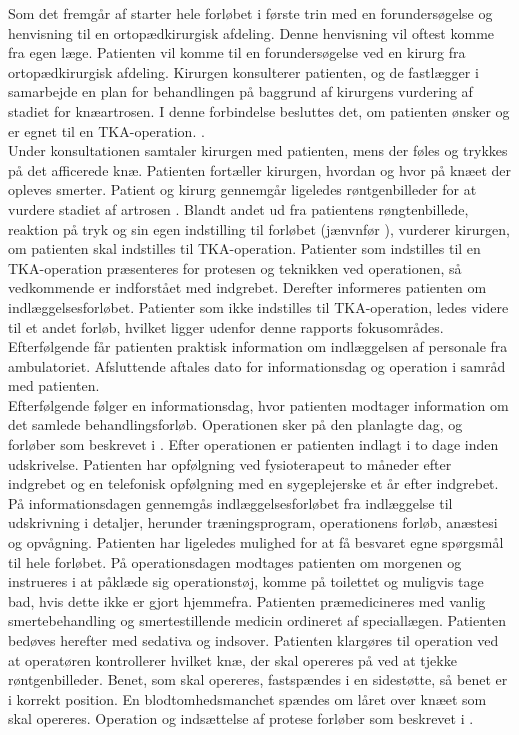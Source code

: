Som det fremgår af  starter hele forløbet i første trin med en forundersøgelse og henvisning til en ortopædkirurgisk afdeling. Denne henvisning vil oftest komme fra egen læge. Patienten vil komme til en forundersøgelse ved en kirurg fra ortopædkirurgisk afdeling. Kirurgen konsulterer patienten, og de fastlægger i samarbejde en plan for behandlingen på baggrund af kirurgens vurdering af stadiet for knæartrosen. I denne forbindelse besluttes det, om patienten ønsker og er egnet til en TKA-operation. \citep{pritka2015}. \\
Under konsultationen samtaler kirurgen med patienten, mens der føles og trykkes på det afficerede knæ. Patienten fortæller kirurgen, hvordan og hvor på knæet der opleves smerter. Patient og kirurg gennemgår ligeledes røntgenbilleder for at vurdere stadiet af artrosen \citep{pritka2015}.
Blandt andet ud fra patientens røngtenbillede, reaktion på tryk og sin egen indstilling til forløbet (jænvnfør ), vurderer kirurgen, om patienten skal indstilles til TKA-operation. Patienter som indstilles til en TKA-operation præsenteres for protesen og teknikken ved operationen, så vedkommende er indforstået med indgrebet. Derefter informeres patienten om indlæggelsesforløbet. Patienter som ikke indstilles til TKA-operation, ledes videre til et andet forløb, hvilket ligger udenfor denne rapports fokusområdes.
Efterfølgende får patienten praktisk information om indlæggelsen af personale fra ambulatoriet. Afsluttende aftales dato for informationsdag og operation i samråd med patienten. \citep{pritka2015} \\
Efterfølgende følger en informationsdag, hvor patienten modtager information om det samlede behandlingsforløb. Operationen sker på den planlagte dag, og forløber som beskrevet i . Efter operationen er patienten indlagt i to dage inden udskrivelse. Patienten har opfølgning ved fysioterapeut to måneder efter indgrebet og en telefonisk opfølgning med en sygeplejerske et år efter indgrebet. \citep{pritka2015} \\
På informationsdagen gennemgås indlæggelsesforløbet fra indlæggelse til udskrivning i detaljer, herunder træningsprogram,  operationens forløb, anæstesi og opvågning. Patienten har ligeledes mulighed for at få besvaret egne spørgsmål til hele forløbet. 
På operationsdagen modtages patienten om morgenen og instrueres i at påklæde sig operationstøj, komme på toilettet og muligvis tage bad, hvis dette ikke er gjort hjemmefra. Patienten præmedicineres med vanlig smertebehandling og smertestillende medicin ordineret af speciallægen. Patienten bedøves herefter med sedativa og indsover. Patienten klargøres til operation ved at operatøren kontrollerer hvilket knæ, der skal opereres på ved at tjekke røntgenbilleder. Benet, som skal opereres, fastspændes i en sidestøtte, så benet er i korrekt position. En blodtomhedsmanchet spændes om låret over knæet som skal opereres. Operation og indsættelse af protese forløber som beskrevet i . \citep{pritka2015} \\
